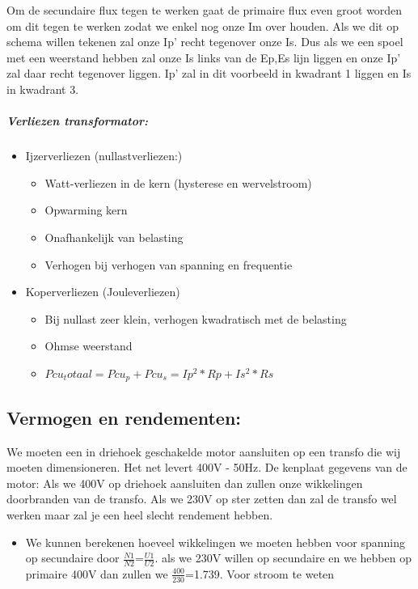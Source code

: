 \documentclass[12pt]{article}
\begin{document}
Om de secundaire flux tegen te werken gaat de primaire flux even groot worden om dit tegen te werken zodat we enkel nog onze Im over houden. Als we dit op schema willen tekenen zal onze Ip' recht tegenover onze Is. Dus als we een spoel met een weerstand hebben zal onze Is links van de Ep,Es lijn liggen en onze Ip' zal daar recht tegenover liggen. Ip' zal in dit voorbeeld in kwadrant 1 liggen en Is in kwadrant 3.
\subparagraph{Verliezen transformator:}
\begin{itemize}
    \item Ijzerverliezen (nullastverliezen:)\begin{itemize}
        \item Watt-verliezen in de kern (hysterese en wervelstroom)
        \item Opwarming kern 
        \item Onafhankelijk van belasting 
        \item Verhogen bij verhogen van spanning en frequentie
    \end{itemize}
    \item Koperverliezen (Jouleverliezen)\begin{itemize}
        \item Bij nullast zeer klein, verhogen kwadratisch met de belasting
        \item Ohmse weerstand
        \item $Pcu_totaal = Pcu_p + Pcu_s = Ip^2*Rp + Is^2*Rs$
    \end{itemize}
\end{itemize}
\subsection{Vermogen en rendementen:}
We moeten een in driehoek geschakelde motor aansluiten op een transfo die wij moeten
dimensioneren. Het net levert 400V - 50Hz. De kenplaat gegevens van de motor:
Als we 400V op driehoek aansluiten dan zullen onze wikkelingen doorbranden van de transfo. Als we 230V op ster zetten dan zal de transfo wel werken maar zal je een heel slecht rendement hebben.
\begin{itemize}
    \item We kunnen berekenen hoeveel wikkelingen we moeten hebben voor spanning op secundaire door $\frac{N1}{N2}$=$\frac{U1}{U2}$. als we 230V willen op secundaire en we hebben op primaire 400V dan zullen we $\frac{400}{230}$=1.739. Voor stroom te weten 
\end{itemize}
\end{document}
